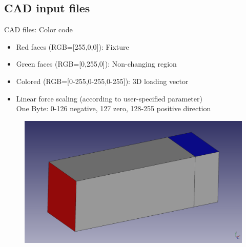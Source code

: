\subsection{CAD input files}
\begin{frame}{CAD files: Color code}

\begin{itemize}
\item Red faces (RGB=[255,0,0]): Fixture
\item Green faces (RGB=[0,255,0]): Non-changing region  
\item Colored (RGB=[0-255,0-255,0-255]): 3D loading vector 
\item Linear force scaling (according to user-specified parameter)\\
One Byte: 0-126 negative, 127 zero, 128-255 positive direction
\end{itemize}
\begin{figure}
\centering
\includegraphics[width=.5\textwidth]{Pictures/CantileverColored.png}
\end{figure}
\end{frame}

